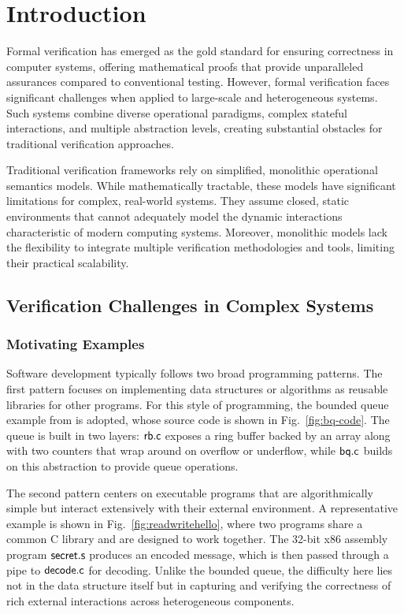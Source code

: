 \chapter{Introduction}

Formal verification has emerged as the gold standard
for ensuring correctness in computer systems,
offering mathematical proofs that provide
unparalleled assurances compared to conventional testing.
However, formal verification faces significant challenges
when applied to large-scale and heterogeneous systems.
Such systems combine diverse operational paradigms,
complex stateful interactions,
and multiple abstraction levels,
creating substantial obstacles
for traditional verification approaches.

Traditional verification frameworks
rely on simplified, monolithic operational semantics models.
While mathematically tractable,
these models have significant limitations
for complex, real-world systems.
They assume closed, static environments
that cannot adequately model
the dynamic interactions characteristic of modern computing systems.
Moreover, monolithic models
lack the flexibility to integrate
multiple verification methodologies and tools,
limiting their practical scalability.

\section{Verification Challenges in Complex Systems}

\subsection{Motivating Examples}

Software development typically follows two broad programming patterns.
The first pattern focuses on implementing data structures or algorithms
as reusable libraries for other programs.
For this style of programming,
the bounded queue example from \citet{rbgs-cal} is adopted,
whose source code is shown in Fig.~\ref{fig:bq-code}.
The queue is built in two layers:
$ \mathsf{rb.c} $ exposes a ring buffer
backed by an array along with two counters
that wrap around on overflow or underflow,
while $ \mathsf{bq.c} $ builds on this abstraction
to provide queue operations.



The second pattern centers on executable programs
that are algorithmically simple
but interact extensively with their external environment.
A representative example is shown in Fig.~\ref{fig:readwritehello},
where two programs share a common C library
and are designed to work together.
The 32-bit x86 assembly program $ \mathsf{secret.s} $ produces an encoded message,
which is then passed through a pipe to $ \mathsf{decode.c} $ for decoding.
Unlike the bounded queue,
the difficulty here lies not in the data structure itself
but in capturing and verifying
the correctness of rich external interactions across heterogeneous components.

